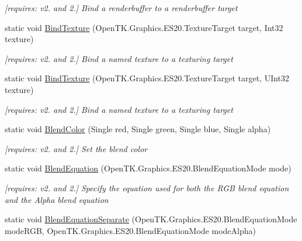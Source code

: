 \begin{DoxyCompactItemize}
\begin{DoxyCompactList}\small\item\em \mbox{[}requires\-: v2. and 2.\mbox{]} Bind a renderbuffer to a renderbuffer target \end{DoxyCompactList}\item 
static void \hyperlink{class_open_t_k_1_1_graphics_1_1_e_s20_1_1_g_l_aa1c33848516d5dfa20a460e657568cfe}{Bind\-Texture} (Open\-T\-K.\-Graphics.\-E\-S20.\-Texture\-Target target, Int32 texture)
\begin{DoxyCompactList}\small\item\em \mbox{[}requires\-: v2. and 2.\mbox{]} Bind a named texture to a texturing target \end{DoxyCompactList}\item 
static void \hyperlink{class_open_t_k_1_1_graphics_1_1_e_s20_1_1_g_l_a2802b0f37ac0ea15584ccbb5b227f1df}{Bind\-Texture} (Open\-T\-K.\-Graphics.\-E\-S20.\-Texture\-Target target, U\-Int32 texture)
\begin{DoxyCompactList}\small\item\em \mbox{[}requires\-: v2. and 2.\mbox{]} Bind a named texture to a texturing target \end{DoxyCompactList}\item 
static void \hyperlink{class_open_t_k_1_1_graphics_1_1_e_s20_1_1_g_l_ad91ca9b5162111c27d1aa5456db4e291}{Blend\-Color} (Single red, Single green, Single blue, Single alpha)
\begin{DoxyCompactList}\small\item\em \mbox{[}requires\-: v2. and 2.\mbox{]} Set the blend color \end{DoxyCompactList}\item 
static void \hyperlink{class_open_t_k_1_1_graphics_1_1_e_s20_1_1_g_l_ad4b44e15b0c49da039f1bf25fc0227f0}{Blend\-Equation} (Open\-T\-K.\-Graphics.\-E\-S20.\-Blend\-Equation\-Mode mode)
\begin{DoxyCompactList}\small\item\em \mbox{[}requires\-: v2. and 2.\mbox{]} Specify the equation used for both the R\-G\-B blend equation and the Alpha blend equation \end{DoxyCompactList}\item 
static void \hyperlink{class_open_t_k_1_1_graphics_1_1_e_s20_1_1_g_l_a4d86dfd48948607aea6cfe3889b813d0}{Blend\-Equation\-Separate} (Open\-T\-K.\-Graphics.\-E\-S20.\-Blend\-Equation\-Mode mode\-R\-G\-B, Open\-T\-K.\-Graphics.\-E\-S20.\-Blend\-Equation\-Mode mode\-Alpha)

\end{DoxyCompactItemize}
